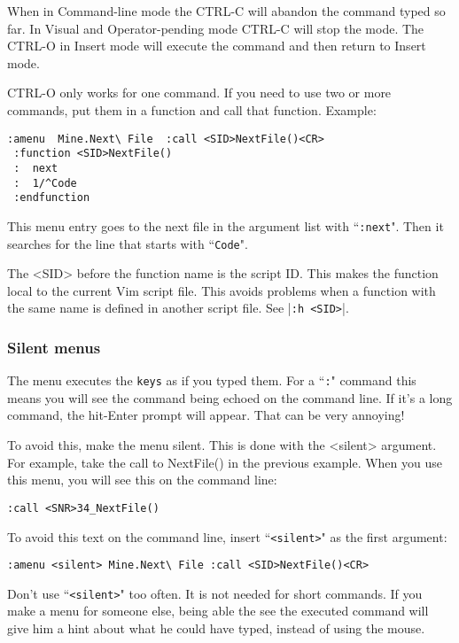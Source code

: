When in Command-line mode the CTRL-C will abandon the command typed so far.
In Visual and Operator-pending mode CTRL-C will stop the mode.
The CTRL-O in Insert mode will execute the command and then return to Insert mode.

CTRL-O only works for one command.
If you need to use two or more commands, put them in a function and call that function.
Example:

\begin{Verbatim}[samepage=true]
 :amenu  Mine.Next\ File  :call <SID>NextFile()<CR>
 :function <SID>NextFile()
 :  next
 :  1/^Code
 :endfunction
\end{Verbatim}

This menu entry goes to the next file in the argument list with ``\texttt{:next}".
Then it searches for the line that starts with ``\texttt{Code}".

The <SID> before the function name is the script ID.
This makes the function local to the current Vim script file.
This avoids problems when a function with the same name is defined in another script file.
See |\texttt{:h <SID>}|.

\subsubsection{Silent menus}
The menu executes the \texttt{{keys}} as if you typed them.
For a ``\texttt{:}" command this means you will see the command being echoed on the command line.
If it's a long command, the hit-Enter prompt will appear.
That can be very annoying!

To avoid this, make the menu silent.
This is done with the <silent> argument.
For example, take the call to NextFile() in the previous example.
When you use this menu, you will see this on the command line:

\begin{Verbatim}[samepage=true]
    :call <SNR>34_NextFile() 
\end{Verbatim}

To avoid this text on the command line, insert ``\texttt{<silent>}" as the first argument:

\begin{Verbatim}[samepage=true]
 :amenu <silent> Mine.Next\ File :call <SID>NextFile()<CR>
\end{Verbatim}

Don't use ``\texttt{<silent>}" too often.
It is not needed for short commands.
If you make a menu for someone else, being able the see the executed command will give him a hint about what he could have typed, instead of using the mouse.

